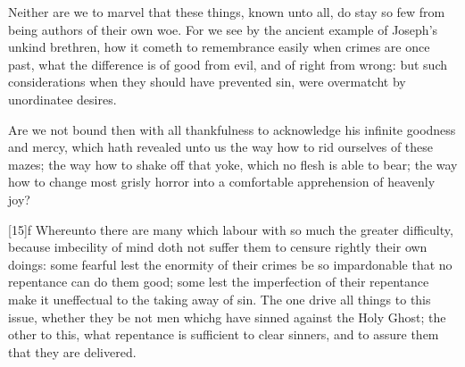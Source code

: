 Neither are we to marvel that these things, known unto all, do stay so few from being authors of their own woe. For we see by the ancient example of Joseph’s unkind brethren, how it cometh to remembrance easily when crimes are once past, what the difference is of good from evil, and of right from wrong: but such considerations when they should have prevented sin, were overmatcht by unordinatee desires.

Are we not bound then with all thankfulness to acknowledge his infinite goodness and mercy, which hath revealed unto us the way how to rid ourselves of these mazes; the way how to shake off that yoke, which no flesh is able to bear; the way how to change most grisly horror into a comfortable apprehension of heavenly joy?

[15]f Whereunto there are many which labour with so much the greater difficulty, because imbecility of mind doth not suffer them to censure rightly their own doings: some fearful lest the enormity of their crimes be so impardonable that no repentance can do them good; some lest the imperfection of their repentance make it uneffectual to the taking away of sin. The one drive all things to this issue, whether  they be not men whichg have sinned against the Holy Ghost; the other to this, what repentance is sufficient to clear sinners, and to assure them that they are delivered.


